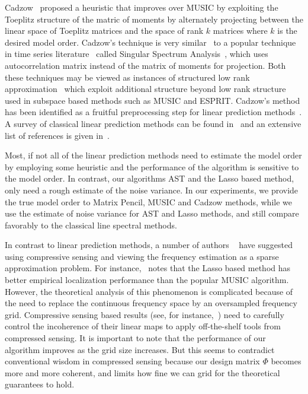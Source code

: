 Cadzow~\cite{cadzow02} proposed a heuristic that improves over MUSIC by 
exploiting the Toeplitz structure of the matric of moments by alternately
projecting between the linear space of Toeplitz matrices and the space of rank
$k$ matrices where $k$ is the desired model order.
Cadzow's technique is very similar~\cite{ssa_special_issue} to a popular
technique in time series literature~\cite{tsbook1,tsbook2} called Singular
Spectrum Analysis~\cite{ssa}, which uses autocorrelation matrix instead
of the matrix of moments for projection. Both these techniques may be viewed as
instances of structured low rank approximation~\cite{chu2003structured} which
exploit additional structure beyond low rank structure used in subspace based
methods such as MUSIC and ESPRIT. Cadzow's method has been identified as a  fruitful preprocessing step for linear prediction methods~\cite{blu08}. A  survey of classical linear prediction methods can be found in~\cite{blu08,StoicaMoses} and an extensive list of references is given in~\cite{stoica93}.

Most, if not all of the linear prediction methods need to estimate the model
order by employing some heuristic and the performance of the algorithm is
sensitive to the model order. In contrast, our algorithms AST and the Lasso
based method, only need a rough estimate of the noise variance. In our experiments, we provide
the true model order to Matrix Pencil, MUSIC and Cadzow methods, while we use
the estimate of noise variance for AST and Lasso methods, and still compare favorably to the classical line spectral methods.

In contrast to linear prediction methods, a number of authors
~\cite{chen98spectrum,malioutov05,bourguignon2007irregular}
have suggested using compressive sensing and viewing the frequency estimation
as a sparse approximation problem. For instance,~\cite{malioutov05} notes that
the Lasso based method has better empirical localization performance than the
popular MUSIC algorithm. However, the theoretical analysis of this phenomenon
is complicated because of the need to replace the continuous frequency space by
an oversampled frequency grid. Compressive sensing based results (see, for
instance,~\cite{duartescs}) need to carefully control the incoherence of their
linear maps to apply off-the-shelf tools from compressed sensing. It is
important to note that the performance of our algorithm improves as the grid
size increases. But this seems to contradict conventional wisdom in compressed
sensing because our design matrix $\Phi$ becomes more and more coherent, and
limits how fine we can grid for the theoretical guarantees to hold.

